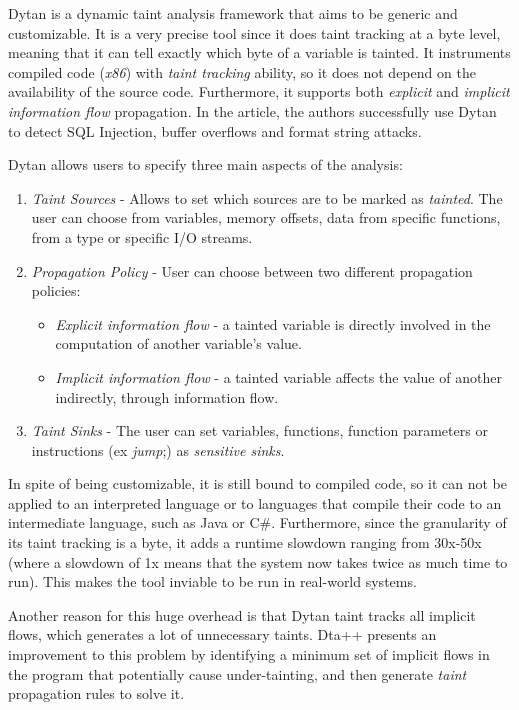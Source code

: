 Dytan \cite{dytan} is a dynamic taint analysis framework that aims to be generic and customizable. It is a very precise tool since it does taint tracking at a byte level, meaning that it can tell exactly which byte of a variable is tainted. It instruments compiled code (\textit{x86}) with \textit{taint tracking} ability, so it does not depend on the availability of the source code. Furthermore, it supports both \textit{explicit} and \textit{implicit information flow} propagation. In the article, the authors successfully use Dytan to detect SQL Injection, buffer overflows and format string attacks.

Dytan allows users to specify three main aspects of the analysis:
\begin{enumerate}
    \item \textit{Taint Sources} - Allows to set which sources are to be marked as \textit{tainted}. The user can choose from variables, memory offsets, data from specific functions, from a type or specific I/O streams.
    \item \textit{Propagation Policy} - User can choose between two different propagation policies: 
    \begin{itemize}
        \item \textit{Explicit information flow} - a tainted variable is directly involved in the computation of another variable's value.
        \item \textit {Implicit information flow} - a tainted variable affects the value of another indirectly, through information flow.
    \end{itemize}
    \item \textit{Taint Sinks} - The user can set variables, functions, function parameters or instructions (ex \textit{jump};) as \textit{sensitive sinks}.
\end{enumerate}

In spite of being customizable, it is still bound to compiled code, so it can not be applied to an interpreted language or to languages that compile their code to an intermediate language, such as Java or C\#. Furthermore, since the granularity of its taint tracking is a byte, it adds a runtime slowdown ranging from 30x-50x (where a slowdown of 1x means that the system now takes twice as much time to run). This makes the tool inviable to be run in real-world systems. 

Another reason for this huge overhead is that Dytan taint tracks all implicit flows, which generates a lot of unnecessary taints. Dta++ \cite{dt++} presents an improvement to this problem by identifying a minimum set of implicit flows in the program that potentially cause under-tainting, and then generate \textit{taint} propagation rules to solve it.


